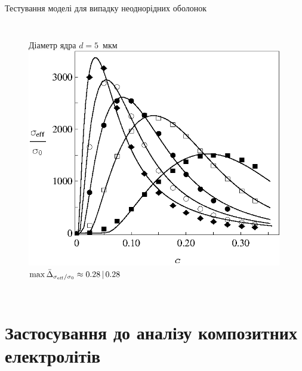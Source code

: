 \documentclass[10pt]{beamer}
\begin{document}
\begin{frame}{Тестування моделі для випадку неоднорідних оболонок}
\begin{columns}[T,onlytextwidth]
      \begin{figure}
        \centering
        { \qquad Діаметр ядра $d=5$~мкм}
        \includegraphics[width=0.99\textwidth]{images/Fig11_Siekierski_d_fixed.eps}
        $\max \bar{\Delta}_{\sigma_{\rm eff}/\sigma_0} \approx 0.28\,|\,0.28$
      \end{figure}
\end{columns}

\end{frame}

\section{Застосування до аналізу композитних електролітів}%

\end{document}
